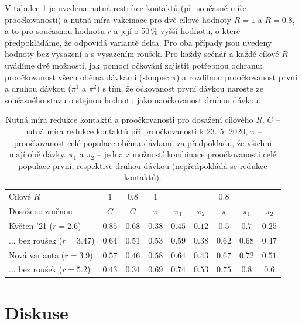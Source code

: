 V tabulce \ref{tab:res} je uvedena nutná restrikce kontaktů (při současné
míře proočkovanosti) a nutná míra vakcinace pro dvě cílové hodnoty
$R=1$ a $R=0.8$, a to pro 
současnou hodnotu $r$ a její o 50\,\% vyšší hodnotu, o které předpokládáme, že odpovídá variantě delta. Pro oba případy jsou uvedeny hodnoty bez vysazení a s vysazením roušek. Pro každý scénář a každé
cílové $R$ uvádíme dvě možnosti, jak pomocí očkování zajistit potřebnou ochranu:
proočkovanost všech oběma dávkami (sloupec $\pi$) a rozdílnou proočkovanost
první a druhou dávkou ($\pi^{1}$ a $\pi^{2})$ s tím, že očkovanost první dávkou naroste ze současného stavu o stejnou hodnotu jako naočkovanost druhou dávkou.
\begin{table}
\begin{center}
\begin{tabular}{l|c|c|ccc|ccc}									 Cílové $R$	& $1$	& $0.8$	& $1$	&	&	& $0.8$	&	&	\\  Dosaženo změnou	& $C$	& $C$	& $\pi$	& $\pi_1$	& $\pi_2$	& $\pi$	& $\pi_1$	& $\pi_2$	\\ \hline Květen '21 ($r=2.6$)	& $0.85$	& $0.68$	& $0.38$	& $0.45$	& $0.12$	& $0.5$	& $0.7$	& $0.25$	\\ ... bez roušek ($r=3.47$)	& $0.64$	& $0.51$	& $0.53$	& $0.59$	& $0.38$	& $0.62$	& $0.68$	& $0.47$	\\ Nová varianta ($r=3.9$)	& $0.57$	& $0.46$	& $0.58$	& $0.64$	& $0.43$	& $0.67$	& $0.72$	& $0.51$	\\ ... bez roušek ($r=5.2$)	& $0.43$	& $0.34$	& $0.69$	& $0.74$	& $0.53$	& $0.75$	& $0.8$	& $0.6$	\\ 
\end{tabular}		
\caption{Nutná míra redukce kontaktů a proočkovanosti pro dosažení cílového $R$. $C$ -- nutná míra redukce kontaktů při proočkovanosti k 23. 5. 2020, $\pi$ -- proočkovanost celé populace oběma dávkami za předpokladu, že všichni mají obě dávky. $\pi_1$ a $\pi_2$ -- jedna z možností kombinace proočkovanosti celé populace první, respektive druhou dávkou (nepředpokládá se redukce kontaktů). }							 	 
\label{tab:res}
\end{center}

\end{table}


\section*{Diskuse}


